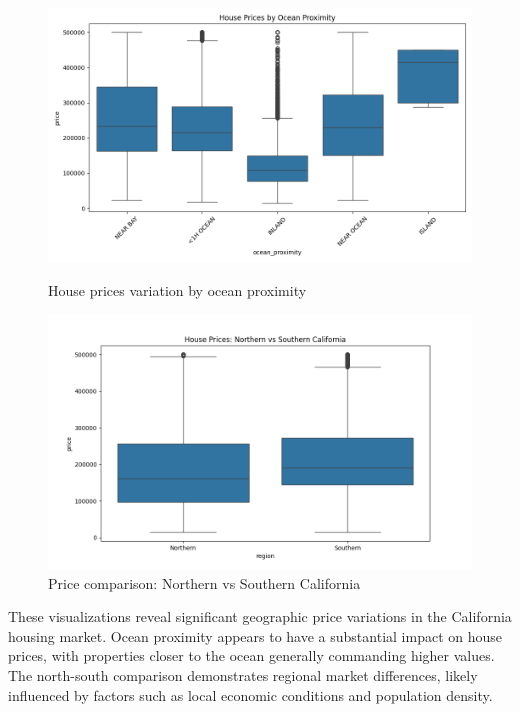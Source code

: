 \documentclass[a4paper, 11pt]{article}
\begin{document}
\begin{figure}[h]
    \centering
    \begin{minipage}{0.48\textwidth}
        \includegraphics[width=\linewidth]{figs/price_by_ocean.png}
        \caption{House prices variation by ocean proximity}
        \label{fig:price_ocean}
    \end{minipage}
    \hfill
    \begin{minipage}{0.48\textwidth}
        \includegraphics[width=\linewidth]{figs/price_by_region.png}
        \caption{Price comparison: Northern vs Southern California}
        \label{fig:price_region}
    \end{minipage}
\end{figure}

These visualizations reveal significant geographic price variations in the California housing market. Ocean proximity appears to have a substantial impact on house prices, with properties closer to the ocean generally commanding higher values. The north-south comparison demonstrates regional market differences, likely influenced by factors such as local economic conditions and population density.
\end{document}
